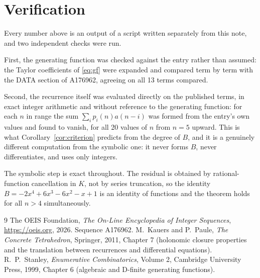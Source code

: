 \documentclass[11pt,a4paper]{article}
\theoremstyle{plain}
\theoremstyle{definition}
\begin{document}
\section{Verification}

Every number above is an output of a script written separately from this note, and two
independent checks were run.

First, the generating function was checked against the entry rather than assumed: the
Taylor coefficients of \eqref{eq:gf} were expanded and compared term by term with the DATA
section of A176962, agreeing on all 13 terms compared.

Second, the recurrence itself was evaluated directly on the published terms, in exact
integer arithmetic and without reference to the generating function: for each $n$ in range
the sum $\sum_{i}p_{i}(n)a(n-i)$ was formed from the entry's own values and found to
vanish, for all 20 values of $n$ from $n=5$ upward. This is what
Corollary~\ref{cor:criterion} predicts from the degree of $B$, and it is a genuinely
different computation from the symbolic one: it never forms $B$, never differentiates, and
uses only integers.

The symbolic step is exact throughout. The residual is obtained by rational-function
cancellation in $K$, not by series truncation, so the identity $B=- 2 x^{4} + 6 x^{3} - 6 x^{2} - x + 1$ is an
identity of functions and the theorem holds for all $n>4$ simultaneously.

\begin{thebibliography}{9}
 The OEIS Foundation, \emph{The On-Line Encyclopedia of Integer Sequences},
\url{https://oeis.org}, 2026. Sequence A176962.
 M.~Kauers and P.~Paule, \emph{The Concrete Tetrahedron}, Springer, 2011,
Chapter 7 (holonomic closure properties and the translation between recurrences and
differential equations).
 R.~P.~Stanley, \emph{Enumerative Combinatorics}, Volume 2, Cambridge
University Press, 1999, Chapter 6 (algebraic and D-finite generating functions).
\end{thebibliography}
\end{document}
